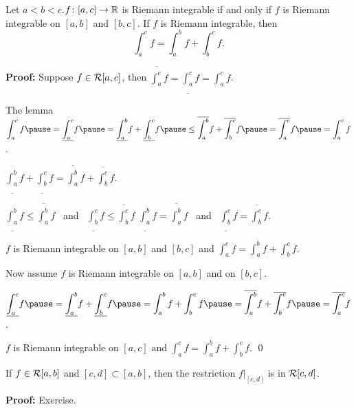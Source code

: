 \documentclass[10pt,aspectratio=149]{beamer}
\begin{document}
\begin{frame}

\begin{proposition}[Additivity]
Let $a < b < c$.\quad $f \colon [a,c] \to {\mathbb{R}}$ is Riemann integrable
if and only if $f$ is Riemann integrable on $[a,b]$ and $[b,c]$.
\pause
If
$f$ is Riemann integrable, then
\begin{equation*}
\int_a^c f
=
\int_a^b f
+
\int_b^c f .
\end{equation*}
\end{proposition}

\pause
\textbf{Proof:}
Suppose $f \in {\mathcal{R}}[a,c]$, then 
$\overline{\int_a^c} f = 
\underline{\int_a^c} f = 
\int_a^c f$.

\pause
\medskip

The lemma \wthus
$\displaystyle
\int_a^c f
\pause
=
\underline{\int_a^c} f
\pause
 =
\underline{\int_a^b} f + \underline{\int_b^c} f
\pause
 \leq
\overline{\int_a^b} f + \overline{\int_b^c} f
\pause
 =
\overline{\int_a^c} f
\pause
 =
\int_a^c f$.

\pause
\medskip

\thus \quad $\displaystyle
\underline{\int_a^b} f + \underline{\int_b^c} f
=
\overline{\int_a^b} f + \overline{\int_b^c} f$.

\pause
\medskip

$\displaystyle\underline{\int_a^b} f \leq \overline{\int_a^b} f$
~and~
$\displaystyle\underline{\int_b^c} f \leq \overline{\int_b^c} f$
\pause
\wthus
$\displaystyle
\underline{\int_a^b} f
=
\overline{\int_a^b} f$
~and~
$\displaystyle
\underline{\int_b^c} f
=
\overline{\int_b^c} f
$.

\pause
\medskip

\thus \quad $f$ is Riemann integrable on $[a,b]$ and $[b,c]$ and
$\int_a^c f
=
\int_a^b f
+
\int_b^c f$.
\end{frame}

\begin{frame}

Now assume $f$ is Riemann integrable on $[a,b]$ and on $[b,c]$.

\pause
\medskip

\quad
$\displaystyle
\underline{\int_a^c} f
\pause
=
\underline{\int_a^b} f + \underline{\int_b^c} f
\pause
=
\int_a^b f + \int_b^c f
\pause
=
\overline{\int_a^b} f + \overline{\int_b^c} f
\pause
=
\overline{\int_a^c} f$.

\pause
\medskip

\thus \quad $f$ is Riemann integrable on $[a,c]$ and
$\int_a^c f
=
\int_a^b f
+
\int_b^c f$.
\qed


\pause
\bigskip

\begin{corollary}
If $f \in {\mathcal{R}}[a,b]$ and
$[c,d] \subset [a,b]$, then
the restriction $f|_{[c,d]}$ is in ${\mathcal{R}}[c,d]$.
\end{corollary}

\pause
\textbf{Proof:} Exercise.

\end{frame}
\end{document}
